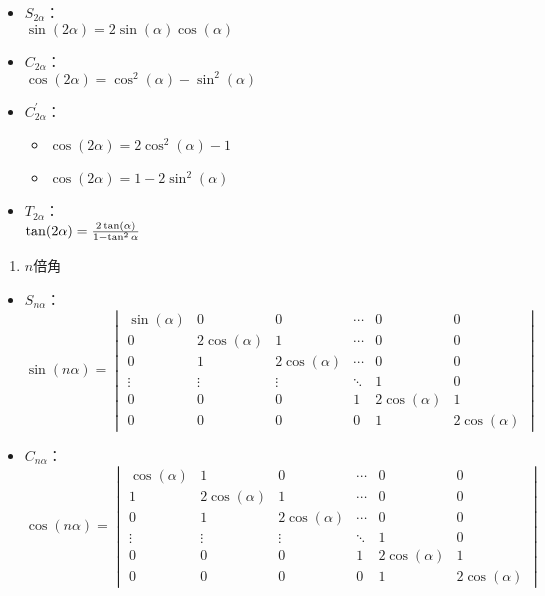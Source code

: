 \documentclass[
]{article}
\begin{document}
\begin{itemize}
\item
  \(S_{2\alpha}\)：\\
  \(\sin(2\alpha) = 2\sin(\alpha)\cos(\alpha)\)
\item
  \(C_{2\alpha}\)：\\
  \(\cos(2\alpha) = \cos^2(\alpha) - \sin^2(\alpha)\)
\item
  \(C_{2\alpha}^\prime\)：

  \begin{itemize}
  \item
    \(\cos(2\alpha) = 2\cos^2(\alpha) - 1\)
  \item
    \(\cos(2\alpha) = 1 - 2\sin^2(\alpha)\)
  \end{itemize}
\item
  \(T_{2\alpha}\)：\\
  \(\tan(2\alpha) = {2\tan(\alpha) \over {1 - \tan^2\alpha}}\)
\end{itemize}

\begin{enumerate}
\def\labelenumi{\arabic{enumi}.}
\item
  \(n\)倍角
\end{enumerate}

\begin{itemize}
\item
  \(S_{n\alpha}\)：\\
  \(\sin(n\alpha) = \begin{vmatrix} \sin(\alpha) & 0 & 0 & \cdots & 0 & 0 \\ 0 & 2\cos(\alpha) & 1 & \cdots & 0 & 0 \\ 0 & 1 & 2\cos(\alpha) & \cdots & 0 & 0 \\ \vdots & \vdots & \vdots & \ddots & 1 & 0 \\ 0 & 0 & 0 & 1 & 2\cos(\alpha) & 1 \\ 0 & 0 & 0 & 0 & 1 & 2\cos(\alpha) \end{vmatrix}\)
\item
  \(C_{n\alpha}\)：\\
  \(\cos(n\alpha) = \begin{vmatrix} \cos(\alpha) & 1 & 0 & \cdots & 0 & 0 \\ 1 & 2\cos(\alpha) & 1 & \cdots & 0 & 0 \\ 0 & 1 & 2\cos(\alpha) & \cdots & 0 & 0 \\ \vdots & \vdots & \vdots & \ddots & 1 & 0 \\ 0 & 0 & 0 & 1 & 2\cos(\alpha) & 1 \\ 0 & 0 & 0 & 0 & 1 & 2\cos(\alpha) \end{vmatrix}\)
\end{itemize}
\end{document}
